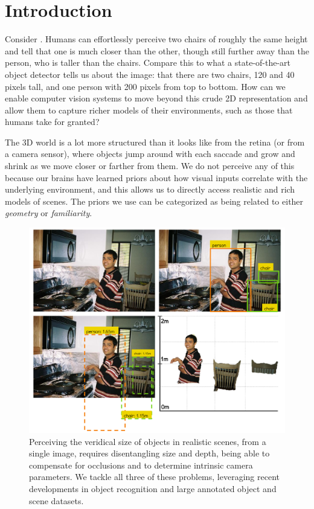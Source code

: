 \section{Introduction}


Consider . Humans can effortlessly perceive two chairs of roughly the same height and tell that one is much closer than the other, though still further away than the person, who is taller than the chairs. Compare this to what a state-of-the-art object detector tells us about the image: that there are two chairs, 120 and 40 pixels tall, and one person with 200 pixels from top to bottom. How can we enable computer vision systems to move beyond this crude 2D representation and allow them to capture richer models of their environments, such as those that humans take for granted?

The 3D world is a lot more structured than it looks like from the retina (or from a camera sensor), where objects jump around with each saccade and grow and shrink as we move closer or farther from them. We do not perceive any of this because our brains have learned priors about how visual inputs correlate with the underlying environment, and this allows us to directly access realistic and rich models of scenes. The priors we use can be categorized as being related to either \textit{geometry} or \textit{familiarity}.

\begin{figure}[t!]
  \centering
  \includegraphics[width=\textwidth]{figures/amodal/Fig_1.png} %
  \caption{ Perceiving the veridical size of objects in realistic scenes, from a single image, requires disentangling size and depth, being able to compensate for occlusions and to determine intrinsic camera parameters. We tackle all three of these problems, leveraging recent developments in object recognition and large annotated object and scene datasets.}
\end{figure}

